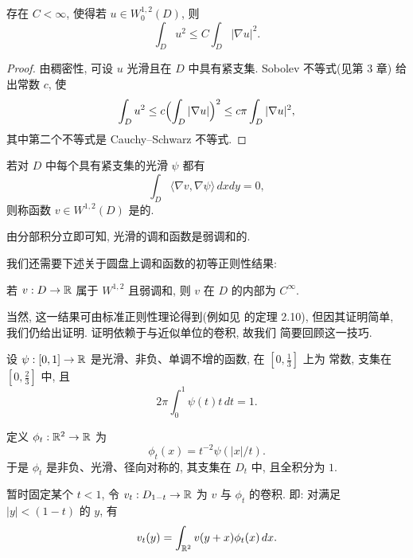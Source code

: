 \begin{lemma}
\label{lem:4.7}
存在 $C<\infty$, 使得若 $u\in W_0^{1,2}(D)$, 则
\begin{equation}
\int_Du^2\leq C\int_D|\nabla u|^2.
\label{eq:4.8}
\end{equation}
\end{lemma}

\begin{proof}
由稠密性, 可设 $u$ 光滑且在 $D$ 中具有紧支集. Sobolev 不等式(见第 3 章)
给出常数 $c$, 使
\begin{equation*}
\int_Du^2\leq c\Bigl(\int_D|\nabla u|\Bigr)^2
 \leq c\pi\int_D|\nabla u|^2,
\end{equation*}
其中第二个不等式是 Cauchy--Schwarz 不等式.
\end{proof}

若对 $D$ 中每个具有紧支集的光滑 $\psi$ 都有
\begin{equation}
\int_D\langle\nabla v,\nabla\psi\rangle\,dxdy=0,
\label{eq:4.9}
\end{equation}
则称函数 $v\in W^{1,2}(D)$ 是的.

由分部积分立即可知, 光滑的调和函数是弱调和的.

我们还需要下述关于圆盘上调和函数的初等正则性结果:

\begin{lemma}[Weyl 引理]
\label{lem:4.8}
若 $v:D\to\mathbb{R}$ 属于 $W^{1,2}$ 且弱调和, 则 $v$ 在 $D$ 的内部为 $C^\infty$.
\end{lemma}

当然, 这一结果可由标准正则性理论得到(例如见 \cite{GiTr} 的定理 2.10),
但因其证明简单, 我们仍给出证明. 证明依赖于与近似单位的卷积, 故我们
简要回顾这一技巧.

设 $\psi:[0,1]\to\mathbb{R}$ 是光滑、非负、单调不增的函数, 在 $[0,\frac13]$ 上为
常数, 支集在 $[0,\frac23]$ 中, 且
\begin{equation}
2\pi\int_0^1\psi(t)t\,dt=1.
\label{eq:4.10}
\end{equation}

定义 $\phi_t:\mathbb{R}^2\to\mathbb{R}$ 为
\begin{equation}
\phi_t(x)=t^{-2}\psi(|x|/t).
\label{eq:4.11}
\end{equation}
于是 $\phi_t$ 是非负、光滑、径向对称的, 其支集在 $D_t$ 中, 且全积分为 $1$.

暂时固定某个 $t<1$, 令 $v_t:D_{1-t}\to\mathbb{R}$ 为 $v$ 与 $\phi_t$ 的卷积.
即: 对满足 $|y|<(1-t)$ 的 $y$, 有
\begin{equation}
v_t(y)=\int_{\mathbb{R}^2}v(y+x)\phi_t(x)\,dx.
\label{eq:4.12}
\end{equation}

